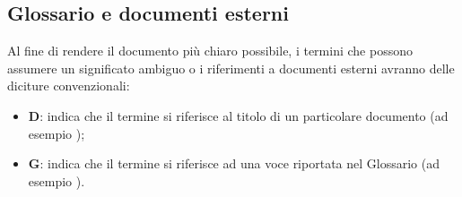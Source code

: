 \subsection{Glossario e documenti esterni}
Al fine di rendere il documento più chiaro possibile, i termini che possono assumere un significato ambiguo o i riferimenti a documenti esterni
avranno delle diciture convenzionali:

\begin{itemize}
    \item \textbf{D}: indica che il termine si riferisce al titolo di un particolare documento (ad esempio \Doc{\PdPv});
    \item \textbf{G}: indica che il termine si riferisce ad una voce riportata nel Glossario (ad esempio ).
\end{itemize}
